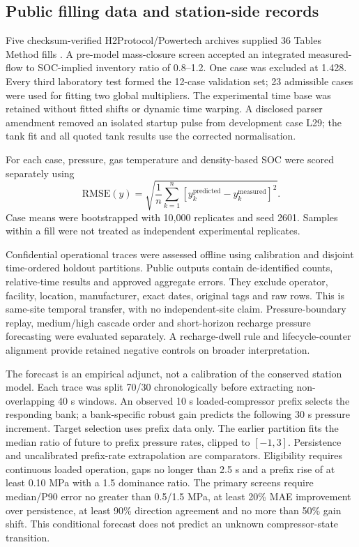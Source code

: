 \documentclass[12pt,a4paper]{article}
\begin{document}
\subsection{Public filling data and station-side records}
Five checksum-verified H2Protocol/Powertech archives supplied 36 Tables Method
fills \cite{schneider2014}. A pre-model mass-closure screen accepted an
integrated measured-flow to SOC-implied inventory ratio of 0.8--1.2. One case
was excluded at 1.428. Every third laboratory test formed the 12-case validation
set; 23 admissible cases were used for fitting two global multipliers. The
experimental time base was retained without fitted shifts or dynamic time
warping. A disclosed parser amendment removed an isolated startup pulse from
development case L29; the tank fit and all quoted tank results use the corrected
normalisation.

For each case, pressure, gas temperature and density-based SOC were scored
separately using
\begin{equation}
 \mathrm{RMSE}(y)=\sqrt{\frac{1}{n}\sum_{k=1}^n
       [y_k^{\mathrm{predicted}}-y_k^{\mathrm{measured}}]^2}.
\end{equation}
Case means were bootstrapped with 10,000 replicates and seed 2601. Samples within
a fill were not treated as independent experimental replicates.

Confidential operational traces were assessed offline using calibration and
disjoint time-ordered holdout partitions. Public outputs contain de-identified
counts, relative-time results and approved aggregate errors. They exclude
operator, facility, location, manufacturer, exact dates, original tags and raw
rows. This is same-site temporal transfer, with no independent-site claim.
Pressure-boundary replay, medium/high cascade order and short-horizon recharge
pressure forecasting were evaluated separately. A recharge-dwell rule and
lifecycle-counter alignment provide retained negative controls on broader
interpretation.

The forecast is an empirical adjunct, not a calibration of the conserved
station model. Each trace was split 70/30 chronologically before extracting
non-overlapping 40 s windows. An observed 10 s loaded-compressor prefix selects
the responding bank; a bank-specific robust gain predicts the following 30 s
pressure increment. Target selection uses prefix data only. The earlier
partition fits the median ratio of future to prefix pressure rates, clipped
to $[-1,3]$. Persistence and uncalibrated prefix-rate extrapolation are
comparators. Eligibility requires continuous loaded operation, gaps no longer
than 2.5 s and a prefix rise of at least 0.10 MPa with a 1.5 dominance ratio.
The primary screens require median/P90 error no greater than 0.5/1.5 MPa,
at least 20\% MAE improvement over persistence, at least 90\% direction
agreement and no more than 50\% gain shift. This conditional forecast does
not predict an unknown compressor-state transition.
\end{document}

